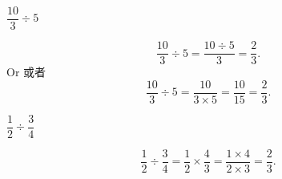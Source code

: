 \begin{example}
$\dfrac{10}{3}\div 5$
\end{example}
\begin{solution}
$$\dfrac{10}{3}\div 5 = \dfrac{10\div 5}{3} = \dfrac{2}{3}.$$
Or 或者
$$\dfrac{10}{3}\div 5 = \dfrac{10}{3\times5} =\dfrac{10}{15} = \dfrac{2}{3}.$$
\end{solution}

\begin{example}
$\dfrac{1}{2}\div \dfrac{3}{4}$
\end{example}
\begin{solution}
$$\dfrac{1}{2}\div \dfrac{3}{4}= \dfrac{1}{2}\times \dfrac{4}{3} = \dfrac{1\times 4}{2\times 3} = \dfrac{2}{3}.$$
\end{solution}
   \newpage